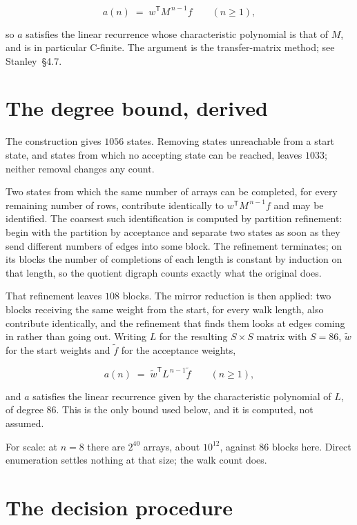 \documentclass[11pt]{article}
\theoremstyle{definition}
\begin{document}
\[a(n) \;=\; w^{\mathsf T} M^{\,n-1} f \qquad (n \ge 1),\]

so $a$ satisfies the linear recurrence whose characteristic polynomial is that of $M$, and is in particular C-finite. The argument is the transfer-matrix method; see Stanley~\S4.7.

\section{The degree bound, derived}

The construction gives $1056$ states. Removing states unreachable from a start state, and states from which no accepting state can be reached, leaves $1033$; neither removal changes any count.

Two states from which the same number of arrays can be completed, for every remaining number of rows, contribute identically to $w^{\mathsf T}M^{\,n-1}f$ and may be identified. The coarsest such identification is computed by partition refinement: begin with the partition by acceptance and separate two states as soon as they send different numbers of edges into some block. The refinement terminates; on its blocks the number of completions of each length is constant by induction on that length, so the quotient digraph counts exactly what the original does.

That refinement leaves $108$ blocks. The mirror reduction is then applied: two blocks receiving the same weight from the start, for every walk length, also contribute identically, and the refinement that finds them looks at edges coming in rather than going out. Writing $L$ for the resulting $S \times S$ matrix with $S = 86$, $\tilde w$ for the start weights and $\tilde f$ for the acceptance weights,

\[a(n) \;=\; \tilde w^{\mathsf T} L^{\,n-1} \tilde f \qquad (n \ge 1),\]

and $a$ satisfies the linear recurrence given by the characteristic polynomial of $L$, of degree $86$. This is the only bound used below, and it is computed, not assumed.

For scale: at $n = 8$ there are $2^{40}$ arrays, about $10^{12}$, against $86$ blocks here. Direct enumeration settles nothing at that size; the walk count does.

\section{The decision procedure}
\end{document}
